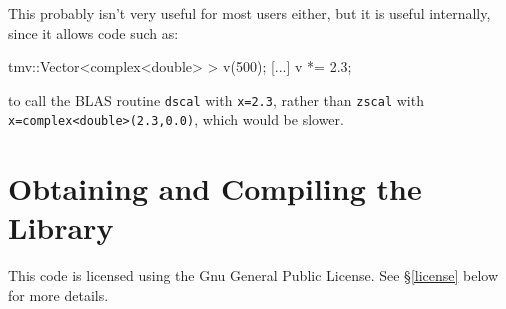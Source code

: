 \documentclass[twoside,letterpaper,11pt]{article}
\renewcommand{\tt}[1]{{\lstinline {#1}}}
\begin{document}
This probably isn't very useful for most users either, but it is useful internally,
since it allows code such as:
\begin{tmvcode}
tmv::Vector<complex<double> > v(500);
[...]
v *= 2.3;
\end{tmvcode}
to call the BLAS routine \tt{dscal} with \tt{x=2.3}, rather than \tt{zscal}
with \tt{x=complex<double>(2.3,0.0)}, which would be slower.

\newpage
\section{Obtaining and Compiling the Library}

This code is licensed using the Gnu General Public License.  See 
\S\ref{license} below for more details.
\end{document}
